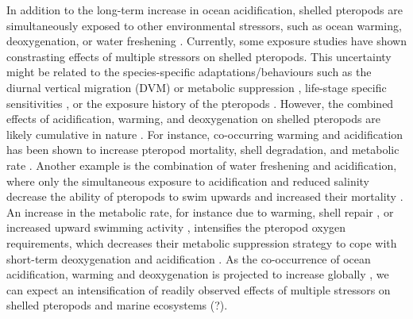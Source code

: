 In addition to the long-term increase in ocean acidification, shelled pteropods are simultaneously exposed to other environmental stressors, such as ocean warming, deoxygenation, or water freshening \citep{Bednarsek2016CumulativeEffects,Maas2012DVM,Manno2012SwimmingBehaviour}. Currently, some exposure studies \citep[e.g. ][]{Comeau2010RepairRates,Lischka2011WarmingAcidificationJuveniles,Lischka2012SynergisticEffects} have shown constrasting effects of multiple stressors on shelled pteropods. This uncertainty might be related to the species-specific adaptations/behaviours such as the diurnal vertical migration (DVM) or metabolic suppression \citep[DVM; ][]{Maas2012DVM}, life-stage specific sensitivities \citep{Kroeker2013JuvenilesCalcifiers,Manno2017ReviewPteropodVulnerability,Bednarsek2019MetaAnalysis}, or the exposure history of the pteropods \citep{Bednarsek2017ExposureHistory}. However, the combined effects of acidification, warming, and deoxygenation on shelled pteropods are likely cumulative in nature \citep{Bednarsek2016CumulativeEffects}.  For instance, co-occurring warming and acidification has been shown to increase pteropod mortality, shell degradation, and metabolic rate \citep{Lischka2012SynergisticEffects,Gardner2017SouthernOceanPteropods}. Another example is the combination of water freshening and acidification, where only the simultaneous exposure to acidification and reduced salinity decrease the ability of pteropods to swim upwards and increased their mortality \citep{Manno2012SwimmingBehaviour}. An increase in the metabolic rate, for instance due to warming, shell repair \citep{Hoshijima2017MetabolicRates}, or increased upward swimming activity \citep{Manno2012SwimmingBehaviour},  intensifies the pteropod oxygen requirements, which decreases their metabolic suppression strategy to cope with short-term deoxygenation and acidification \citep{Fabry2008MetabolicSuppression}. As the co-occurrence of ocean acidification, warming and deoxygenation is projected to increase globally \citep{Gruber2011TripleWhammy,?}, we can expect an intensification of readily observed effects of multiple stressors on shelled pteropods and marine ecosystems (?).


